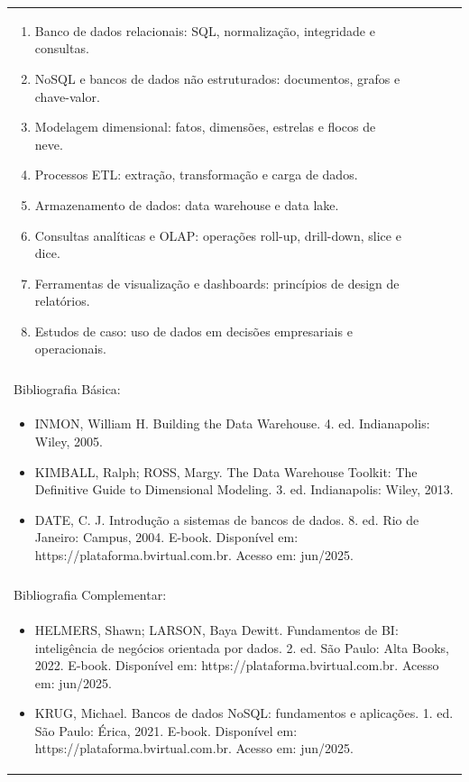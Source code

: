 \documentclass[11pt]{article}
\begin{document}
\begin{center}
\begin{longtable}{|p{4cm}|p{4cm}|p{4cm}|p{4cm}|}
{\begin{enumerate}
\item Banco de dados relacionais: SQL, normalização, integridade e consultas.
\item NoSQL e bancos de dados não estruturados: documentos, grafos e chave-valor.
\item Modelagem dimensional: fatos, dimensões, estrelas e flocos de neve.
\item Processos ETL: extração, transformação e carga de dados.
\item Armazenamento de dados: data warehouse e data lake.
\item Consultas analíticas e OLAP: operações roll-up, drill-down, slice e dice.
\item Ferramentas de visualização e dashboards: princípios de design de relatórios.
\item Estudos de caso: uso de dados em decisões empresariais e operacionais.\end{enumerate}}\\
\multicolumn{4}{|p{16cm}|}{}\\
\hline
\multicolumn{4}{|p{16cm}|}{Bibliografia Básica:}\\
\multicolumn{4}{|p{16cm}|}{%
\begin{itemize}\item INMON, William H. Building the Data Warehouse. 4. ed. Indianapolis: Wiley, 2005.
\item KIMBALL, Ralph; ROSS, Margy. The Data Warehouse Toolkit: The Definitive Guide to Dimensional Modeling. 3. ed. Indianapolis: Wiley, 2013.
\item DATE, C. J. Introdução a sistemas de bancos de dados. 8. ed. Rio de Janeiro: Campus, 2004. E-book. Disponível em: https://plataforma.bvirtual.com.br. Acesso em: jun/2025.\end{itemize}}\\
\multicolumn{4}{|p{16cm}|}{}\\
\hline
\multicolumn{4}{|p{16cm}|}{Bibliografia Complementar:}\\
\multicolumn{4}{|p{16cm}|}{%
\begin{itemize}\item HELMERS, Shawn; LARSON, Baya Dewitt. Fundamentos de BI: inteligência de negócios orientada por dados. 2. ed. São Paulo: Alta Books, 2022. E-book. Disponível em: https://plataforma.bvirtual.com.br. Acesso em: jun/2025.
\item KRUG, Michael. Bancos de dados NoSQL: fundamentos e aplicações. 1. ed. São Paulo: Érica, 2021. E-book. Disponível em: https://plataforma.bvirtual.com.br. Acesso em: jun/2025.

\end{itemize}}
\end{longtable}
\end{center}
\end{document}
